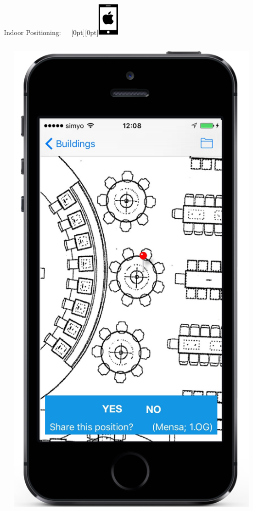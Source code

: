 \documentclass[11pt]{beamer}
\begin{document}
\begin{frame}{Indoor Positioning:~~~\raisebox{-10pt}[0pt][0pt]{\includegraphics[width=0.08\textwidth]{tech-stack-apple}}}
\begin{columns}[T]
\begin{column}{.6\textwidth}
\begin{itemize}
  \end{itemize}
  \end{column}
  \begin{column}{.4\textwidth}
  \includegraphics[scale=0.25]{mappinpointa}
  \end{column}
\end{columns}

\end{frame}
\end{document}
